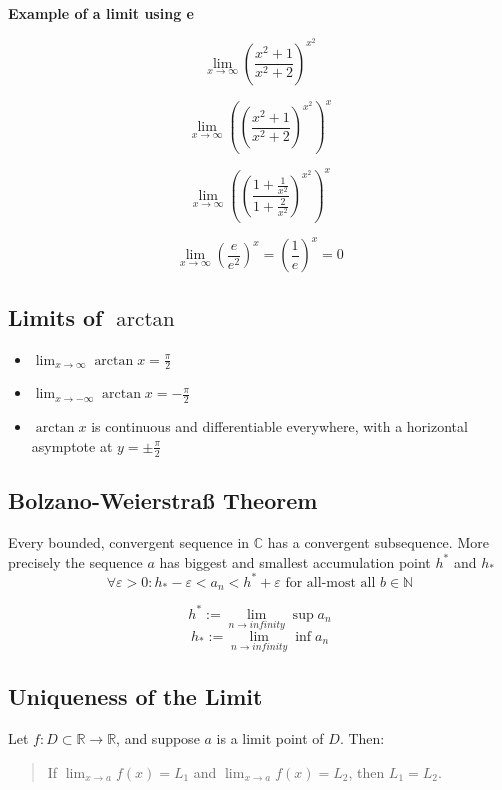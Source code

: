 \textbf{Example of a limit using e}

\[
\lim_{x \to \infty}{\left(\frac{x^2 + 1}{x^2 +2}\right)}^{x^2}
\]

\[
\lim_{x \to \infty} {\left({\left(\frac{x^2 + 1}{x^2 +2}\right)}^{x^2}\right)}^x
\]

\[
\lim_{x \to \infty} {\left({\left(\frac{1 + \frac{1}{x^2}}{1 + \frac{2}{x^2}}\right)}^{x^2}\right)}^x
\]

\[
\lim_{x \to \infty} {\left(\frac{e}{e^2}\right)}^x = {\left(\frac{1}{e}\right)}^x = 0
\]


\subsection{Limits of \texorpdfstring{\(\arctan\)}{arctan}}

\begin{itemize}[label=\(-\)]
\item \(\displaystyle \lim_{x \to \infty} \arctan x = \frac{\pi}{2}\)
\item \(\displaystyle \lim_{x \to -\infty} \arctan x = -\frac{\pi}{2}\)
\item \(\arctan x\) is continuous and differentiable everywhere, with a horizontal asymptote at \(y = \pm \frac{\pi}{2}\)
\end{itemize}

\subsection{Bolzano-Weierstraß Theorem}

Every bounded, convergent sequence in \(\mathbb{C}\) has a convergent subsequence.
More precisely the sequence \(a\) has biggest and smallest accumulation point \(h^*\) and \(h_*\)
\[\forall \varepsilon > 0 : h_* - \varepsilon < a_n < h^{*} + \varepsilon \text{ for all-most all } b \in \mathbb{N}\]

\[h^* := \lim_{n \to infinity} \sup a_n\]
\[h_* := \lim_{n \to infinity} \inf a_n\]

\subsection{Uniqueness of the Limit}

Let \( f: D \subset \mathbb{R} \to \mathbb{R} \), and suppose \( a \) is a limit point of \( D \). Then:

\begin{quote}
If \( \lim_{x \to a} f(x) = L_1 \) and \( \lim_{x \to a} f(x) = L_2 \), then \( L_1 = L_2 \).
\end{quote}

